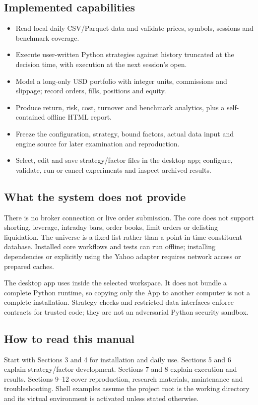 \documentclass[11pt]{article}
\let\originalsubsection\subsection
\renewcommand{\subsection}{\Needspace{8\baselineskip}\originalsubsection}
\begin{document}
\subsection{Implemented capabilities}
\begin{itemize}
\item Read local daily CSV/Parquet data and validate prices, symbols, sessions and benchmark coverage.
\item Execute user-written Python strategies against history truncated at the decision time, with execution at the next session's open.
\item Model a long-only USD portfolio with integer units, commissions and slippage; record orders, fills, positions and equity.
\item Produce return, risk, cost, turnover and benchmark analytics, plus a self-contained offline HTML report.
\item Freeze the configuration, strategy, bound factors, actual data input and engine source for later examination and reproduction.
\item Select, edit and save strategy/factor files in the desktop app; configure, validate, run or cancel experiments and inspect archived results.
\end{itemize}

\subsection{What the system does not provide}
There is no broker connection or live order submission. The core does not support shorting, leverage, intraday bars, order books, limit orders or delisting liquidation. The universe is a fixed list rather than a point-in-time constituent database. Installed core workflows and tests can run offline; installing dependencies or explicitly using the Yahoo adapter requires network access or prepared caches.

The desktop app uses  inside the selected workspace. It does not bundle a complete Python runtime, so copying only the App to another computer is not a complete installation. Strategy checks and restricted data interfaces enforce contracts for trusted code; they are not an adversarial Python security sandbox.

\subsection{How to read this manual}
Start with Sections 3 and 4 for installation and daily use. Sections 5 and 6 explain strategy/factor development. Sections 7 and 8 explain execution and results. Sections 9--12 cover reproduction, research materials, maintenance and troubleshooting. Shell examples assume the project root is the working directory and its virtual environment is activated unless stated otherwise.
\end{document}
